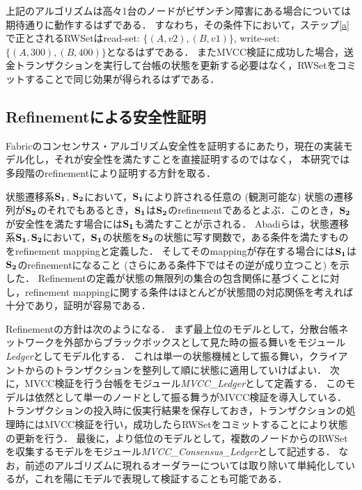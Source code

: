 \documentclass{fose2019}           %
\begin{document}
上記のアルゴリズムは高々1台のノードがビザンチン障害にある場合については期待通りに動作するはずである．
すなわち，その条件下において，ステップ\ref{a}で正とされるRWSetはread-set: $\{ (A, v2), (B, v1) \}$, write-set: $\{ (A, 300), (B, 400) \}$となるはずである．
またMVCC検証に成功した場合，送金トランザクションを実行して台帳の状態を更新する必要はなく，RWSetをコミットすることで同じ効果が得られるはずである．

\subsection{Refinementによる安全性証明}

Fabricのコンセンサス・アルゴリズム安全性を証明するにあたり，現在の実装モデル化し，それが安全性を満たすことを直接証明するのではなく，
本研究では多段階のrefinementにより証明する方針を取る．

状態遷移系$\mathbf{S_{1}}$, $\mathbf{S_{2}}$において，$\mathbf{S_{1}}$により許される任意の (観測可能な) 状態の遷移列が$\mathbf{S_{2}}$のそれでもあるとき，$\mathbf{S_{1}}$は$\mathbf{S_{2}}$のrefinementであるとよぶ．このとき，$\mathbf{S_{2}}$が安全性を満たす場合には$\mathbf{S_{1}}$も満たすことが示される．
Abadiらは，状態遷移系$\mathbf{S_{1}},\mathbf{S_{2}}$において，$\mathbf{S_{1}}$の状態を$\mathbf{S_{2}}$の状態に写す関数で，ある条件を満たすものをrefinement mappingと定義した．
そしてそのmappingが存在する場合には$\mathbf{S_{1}}$は$\mathbf{S_{2}}$のrefinementになること (さらにある条件下ではその逆が成り立つこと) を示した\cite{refmap}．
Refinementの定義が状態の無限列の集合の包含関係に基づくことに対し，refinement mappingに関する条件はほとんどが状態間の対応関係を考えれば十分であり，証明が容易である．

Refinementの方針は次のようになる．
まず最上位のモデルとして，分散台帳ネットワークを外部からブラックボックスとして見た時の振る舞いをモジュール\textit{Ledger}としてモデル化する．
これは単一の状態機械として振る舞い，クライアントからのトランザクションを整列して順に状態に適用していけばよい．
次に，MVCC検証を行う台帳をモジュール\textit{MVCC\_Ledger}として定義する．
このモデルは依然として単一のノードとして振る舞うがMVCC検証を導入している．
トランザクションの投入時に仮実行結果を保存しておき，トランザクションの処理時にはMVCC検証を行い，成功したらRWSetをコミットすることにより状態の更新を行う．
最後に，より低位のモデルとして，複数のノードからのRWSetを収集するモデルをモジュール\textit{MVCC\_Consensus\_Ledger}として記述する．
なお，前述のアルゴリズムに現れるオーダラーについては取り除いて単純化しているが，これを陽にモデルで表現して検証することも可能である．
\end{document}
